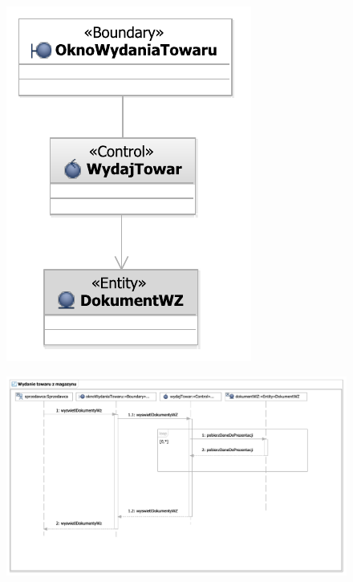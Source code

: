 \begin{figure}[H]
  \centering
  \includegraphics[angle=\ecbangle, scale=\ecbscale]{../img/usecase/pu12ecb.pdf}
  \caption{}
\end{figure}
\newpage
\begin{figure}[H]
  \centering
  \includegraphics[angle=\seqangle, scale=\seqscale]{../img/usecase/pu12seq.pdf}
  \caption{}
\end{figure}
\newpage


